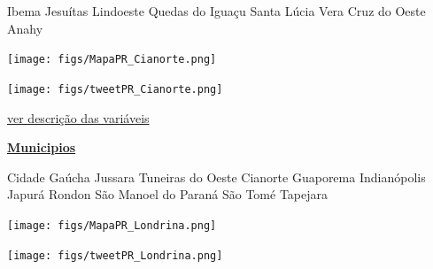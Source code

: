 \documentclass[10pt]{article} %
\begin{document}
\begin{minipage}[t]{.30\linewidth}
\begin{mdframed}[style=sidebar,frametitle={}]
\begin{itemize}
\gsquare Ibema 
\gsquare Jesuítas 
\gsquare Lindoeste 
\gsquare Quedas do Iguaçu 
\gsquare Santa Lúcia 
\gsquare Vera Cruz do Oeste 
\gsquare Anahy 
\end{itemize}\BackToContents\end{mdframed}\hfill\end{minipage}\newpage\begin{minipage}[t]{.66\linewidth}
\hypertarget{Cnrt}{}
\texttt{[image: figs/MapaPR\_Cianorte.png]}\vspace{0.5cm}\vspace{0.5cm}\begin{center}
\texttt{[image: figs/tweetPR\_Cianorte.png]}\end{center}
\begin{center}

\end{center}
\small{\hyperlink{vartab}{ver descrição das variáveis}}\end{minipage}\hfill\begin{minipage}[t]{.30\linewidth}
\begin{mdframed}[style=sidebar,frametitle={}]
\textbf{\hyperlink{municips}{Municipios}}\begin{itemize}\gsquare Cidade Gaúcha 
\gsquare Jussara 
\gsquare Tuneiras do Oeste 
\gsquare Cianorte 
\gsquare Guaporema 
\gsquare Indianópolis 
\gsquare Japurá 
\gsquare Rondon 
\gsquare São Manoel do Paraná 
\gsquare São Tomé 
\gsquare Tapejara 
\end{itemize}\BackToContents\end{mdframed}\hfill\end{minipage}\newpage\begin{minipage}[t]{.66\linewidth}
\hypertarget{Lndr}{}
\texttt{[image: figs/MapaPR\_Londrina.png]}\vspace{0.5cm}\vspace{0.5cm}\begin{center}
\texttt{[image: figs/tweetPR\_Londrina.png]}\end{center}
\begin{center}

\end{center}
\end{minipage}
\end{document}
